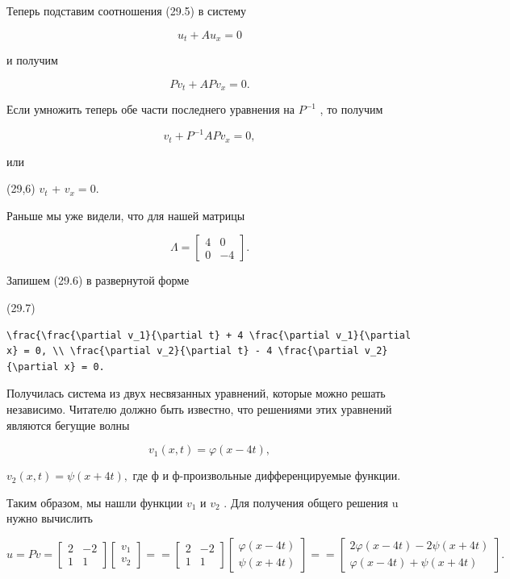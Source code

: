 \documentclass[
  ukrainian,
]{article}
\begin{document}
Теперь подставим соотношения (29.5) в систему

\[
u_t + Au_x = 0
\]

и получим

\[
Pv_t + APv_x = 0.
\]

Если умножить теперь обе части последнего уравнения на \(P^{-1}\) , то
получим

\[
v_t + P^{-1}APv_x = 0,
\]

или

(29,6) \(v_t\) + \Lambda \(v_x = 0\).

Раньше мы уже видели, что для нашей матрицы

\[
\Lambda = \begin{bmatrix} 4 & 0 \\ 0 & -4 \end{bmatrix}.
\]

Запишем (29.6) в развернутой форме

(29.7)

\begin{verbatim}
\frac{\frac{\partial v_1}{\partial t} + 4 \frac{\partial v_1}{\partial x} = 0, \\ \frac{\partial v_2}{\partial t} - 4 \frac{\partial v_2}{\partial x} = 0.
\end{verbatim}

Получилась система из двух несвязанных уравнений, которые можно решать
независимо. Читателю должно быть известно, что решениями этих уравнений
являются бегущие волны

\[
v_1(x, t) = \varphi(x-4t),
\]

\(v_2(x, t) = \psi(x+4t),\) где ф и ф-произвольные дифференцируемые
функции.

Таким образом, мы нашли функции \(v_1\) и \(v_2\) . Для получения общего
решения u нужно вычислить

\[
u = Pv = \begin{bmatrix} 2 & -2 \\ 1 & 1 \end{bmatrix} \begin{bmatrix} v_1 \\ v_2 \end{bmatrix} =
= \begin{bmatrix} 2 & -2 \\ 1 & 1 \end{bmatrix} \begin{bmatrix} \varphi(x - 4t) \\ \psi(x + 4t) \end{bmatrix} =
= \begin{bmatrix} 2\varphi(x - 4t) - 2\psi(x + 4t) \\ \varphi(x - 4t) + \psi(x + 4t) \end{bmatrix}.
\]
\end{document}
